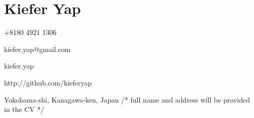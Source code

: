\section*{\hfill Kiefer Yap \hfill}

\speciallinebreak
\begin{description}
	\begin{multicols}{2}
		\item[\faPhone] +8180 4921 1306
		\item[\faEnvelope] kiefer.yap@gmail.com
		\item[\faSkype] kiefer.yap
		\item[\faGit] http://github.com/kieferyap
	\end{multicols}
	\item[\faHome] Yokohama-shi, Kanagawa-ken, Japan {\small{\color{gray}/* full name and address will be provided in the CV */ }}
\end{description}